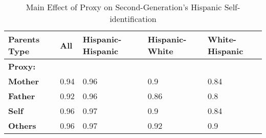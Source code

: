 \begin{table}[H]

\caption{Main Effect of Proxy on Second-Generation's Hispanic Self-identification \label{tab:hispbyproxy}}
\centering
\fontsize{12}{14}\selectfont
\begin{tabular}[c]{>{}lllll}
\toprule
Parents Type & All & Hispanic-Hispanic & Hispanic-White & White-Hispanic\\
\midrule
\textbf{Proxy:} &  &  &  & \\
\hspace{1em}\textbf{Mother} & 0.94 & 0.96 & 0.9 & 0.84\\
\hspace{1em}\textbf{Father} & 0.92 & 0.96 & 0.86 & 0.8\\
\hspace{1em}\textbf{Self} & 0.96 & 0.97 & 0.9 & 0.84\\
\hspace{1em}\textbf{Others} & 0.96 & 0.97 & 0.92 & 0.9\\
\bottomrule
\end{tabular}
\end{table}
